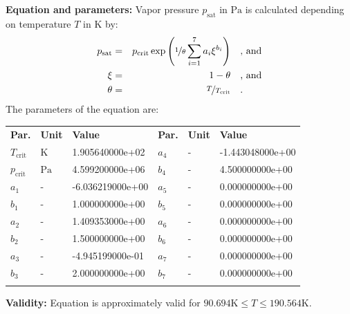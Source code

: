\textbf{Equation and parameters:}
\newline
%
Vapor pressure $p_\mathrm{sat}$ in $\si{\pascal}$ is calculated depending on temperature $T$ in $\si{\kelvin}$ by:
%
\begin{equation*}
\begin{split}
p_\mathrm{sat} &=& p_\mathrm{crit} \exp \left( \nicefrac{1}{\theta} \sum_{i=1}^{7} a_i \xi^{b_i} \right) & \quad\text{, and} \\
\xi &=& 1 - \theta & \quad\text{, and} \\
\theta &=& \nicefrac{T}{T_\mathrm{crit}} & \quad\text{.}
\end{split}
\end{equation*}
%
The parameters of the equation are:
%
\begin{longtable}[l]{lll|lll}
\toprule
\addlinespace
\textbf{Par.} & \textbf{Unit} & \textbf{Value} &	\textbf{Par.} & \textbf{Unit} & \textbf{Value} \\
\addlinespace
\midrule
\endhead

\bottomrule
\endfoot
\bottomrule
\endlastfoot
\addlinespace

$T_\mathrm{crit}$ & $\si{\kelvin}$ & 1.905640000e+02 & $a_4$ & - & -1.443048000e+00 \\
$p_\mathrm{crit}$ & $\si{\pascal}$ & 4.599200000e+06 & $b_4$ & - & 4.500000000e+00 \\
$a_1$ & - & -6.036219000e+00 & $a_5$ & - & 0.000000000e+00 \\
$b_1$ & - & 1.000000000e+00 & $b_5$ & - & 0.000000000e+00 \\
$a_2$ & - & 1.409353000e+00 & $a_6$ & - & 0.000000000e+00 \\
$b_2$ & - & 1.500000000e+00 & $b_6$ & - & 0.000000000e+00 \\
$a_3$ & - & -4.945199000e-01 & $a_7$ & - & 0.000000000e+00 \\
$b_3$ & - & 2.000000000e+00 & $b_7$ & - & 0.000000000e+00 \\

\addlinespace\end{longtable}

\textbf{Validity:}
\newline
Equation is approximately valid for $90.694 \si{\kelvin} \leq T \leq 190.564 \si{\kelvin}$.
\newline

